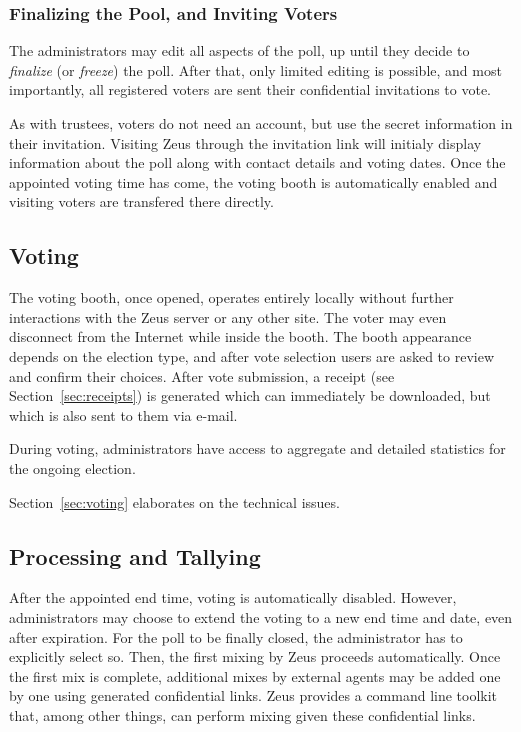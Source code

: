 \documentclass[letterpaper,10pt]{article}
\begin{document}
\subsubsection{Finalizing the Pool, and Inviting Voters}
The administrators may edit all aspects of the poll, up until they
decide to \emph{finalize} (or \emph{freeze}) the poll.
After that, only limited editing is possible, and most importantly,
all registered voters are sent their confidential invitations to vote.

As with trustees, voters do not need an account, but use the secret
information in their invitation.
Visiting Zeus through the invitation link will initialy display
information about the poll along with contact details and voting dates.
Once the appointed voting time has come, the voting booth is
automatically enabled and visiting voters are transfered there directly.

\subsection{Voting}
The voting booth, once opened, operates entirely locally without
further interactions with the Zeus server or any other site.
The voter may even disconnect from the Internet while inside the booth.
The booth appearance depends on the election type, and after vote
selection users are asked to review and confirm their choices.
After vote submission, a receipt (see Section~\ref{sec:receipts}) is
generated which can immediately be downloaded, but which is also sent
to them via e-mail.

During voting, administrators have access to aggregate and detailed
statistics for the ongoing election.

Section~\ref{sec:voting} elaborates on the technical issues.

\subsection{Processing and Tallying}
After the appointed end time, voting is automatically disabled.
However, administrators may choose to extend the voting to a new end
time and date, even after expiration.
For the poll to be finally closed,
the administrator has to explicitly select so.
Then, the first mixing by Zeus proceeds automatically.
Once the first mix is complete, additional mixes by external agents
may be added one by one using generated confidential links.
Zeus provides a command line toolkit that, among other things, can
perform mixing given these confidential links.
\end{document}
